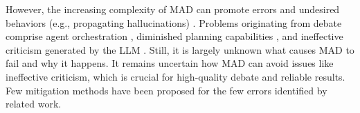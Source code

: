 However, the increasing complexity of MAD can promote errors and undesired behaviors (e.g., propagating hallucinations) \citep{GuoCWC24a}.
Problems originating from debate comprise agent orchestration \citep{WangWST24, ShahW24}, diminished planning capabilities \citep{ValmeekamMK23a}, and ineffective criticism generated by the LLM \citep{StechlyMK23a}.
Still, it is largely unknown what causes MAD to fail and why it happens.
It remains uncertain how MAD can avoid issues like ineffective criticism, which is crucial for high-quality debate and reliable results.
Few mitigation methods have been proposed for the few errors identified by related work.


